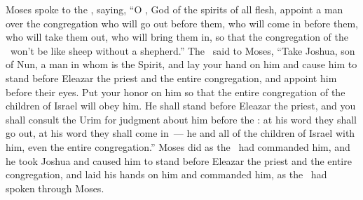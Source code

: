 \begin{inparaenum}
   Moses spoke to the \lord, saying,%
   ``O \lord, God of the spirits of all flesh, appoint a man over the congregation%
   who will go out before them, who will come in before them, who will take them out, who will bring them in, so that the congregation of the \lord\ won't be like sheep without a shepherd.''%
   The \lord\ said to Moses, ``Take Joshua, son of Nun, a man in whom is the Spirit, and lay your hand on him%
   and cause him to stand before Eleazar the priest and the entire congregation, and appoint him before their eyes.%
   Put your honor on him so that the entire congregation of the children of Israel will obey him.%
   He shall stand before Eleazar the priest, and you shall consult the Urim for judgment about him before the \lord: at his word they shall go out, at his word they shall come in~--- he and all of the children of Israel with him, even the entire congregation.''%
   Moses did as the \lord\ had commanded him, and he took Joshua and caused him to stand before Eleazar the priest and the entire congregation,%
   and laid his hands on him and commanded him, as the \lord\ had spoken through Moses.%
\end{inparaenum}
